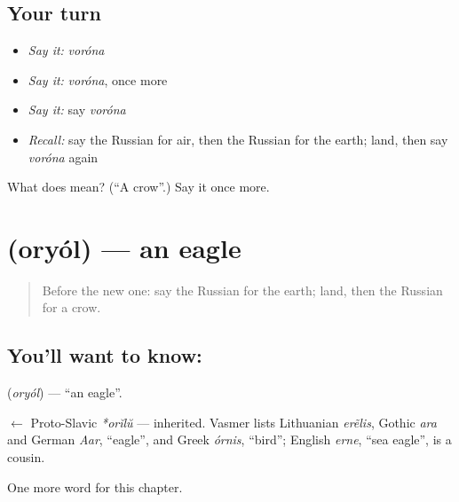 \subsection*{Your turn}
\begin{itemize}
\raggedright
  \item \emph{Say it:} \emph{voróna}
  \item \emph{Say it:} \emph{voróna}, once more
  \item \emph{Say it:} say \emph{voróna}
  \item \emph{Recall:} say the Russian for air, then the Russian for the earth; land, then say \emph{voróna} again
\end{itemize}

\begin{tcolorbox}[breakable,colback=teal!4,colframe=teal!35!black,title={Before you move on}]
What does  mean? (\textquotedblleft{}A crow\textquotedblright{}.) Say it once more.
\end{tcolorbox}
\section[\texorpdfstring{\ru{орёл} (oryól)}{орёл (oryól)}]{ (oryól) — an eagle}

\label{lesson:RU-C165-oryol}



\begin{quote}
Before the new one: say the Russian for the earth; land, then the Russian for a crow.
\end{quote}

\subsection*{You'll want to know: }
\textbf{} (\emph{oryól}) — \textquotedblleft{}an eagle\textquotedblright{}.

\begin{cousinweb}
\textbf{} $\leftarrow$ Proto-Slavic \emph{*orĭlŭ} — inherited. Vasmer lists Lithuanian \emph{erẽlis}, Gothic \emph{ara} and German \emph{Aar}, \textquotedblleft{}eagle\textquotedblright{}, and Greek \emph{órnis}, \textquotedblleft{}bird\textquotedblright{}; English \emph{erne}, \textquotedblleft{}sea eagle\textquotedblright{}, is a cousin.
\end{cousinweb}

\begin{grammarlens}[title={What you've built}]
One more word for this chapter.
\end{grammarlens}

